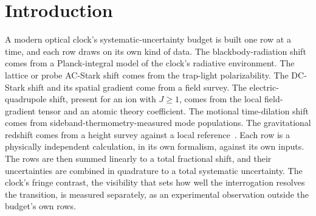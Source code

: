 \documentclass[aps,pra,superscriptaddress,groupedaddress,nofootinbib]{revtex4-2}
\begin{document}
\maketitle

\section{Introduction}
\label{sec:intro}

A modern optical clock's systematic-uncertainty budget is built one row
at a time, and each row draws on its own kind of data. The
blackbody-radiation shift comes from a Planck-integral model of the
clock's radiative environment. The lattice or probe AC-Stark shift
comes from the trap-light polarizability. The DC-Stark shift and its
spatial gradient come from a field survey. The electric-quadrupole
shift, present for an ion with $J\ge1$, comes from the local
field-gradient tensor and an atomic theory coefficient. The motional
time-dilation shift comes from sideband-thermometry-measured mode
populations. The gravitational redshift comes from a height survey
against a local reference~\cite{Ludlow2015}. Each row is a physically
independent calculation, in its own formalism, against its own inputs.
The rows are then summed linearly to a total fractional shift, and their
uncertainties are combined in quadrature to a total systematic
uncertainty. The clock's fringe contrast, the visibility that sets
how well the interrogation resolves the transition, is
measured separately, as an experimental observation outside the
budget's own rows.
\end{document}
